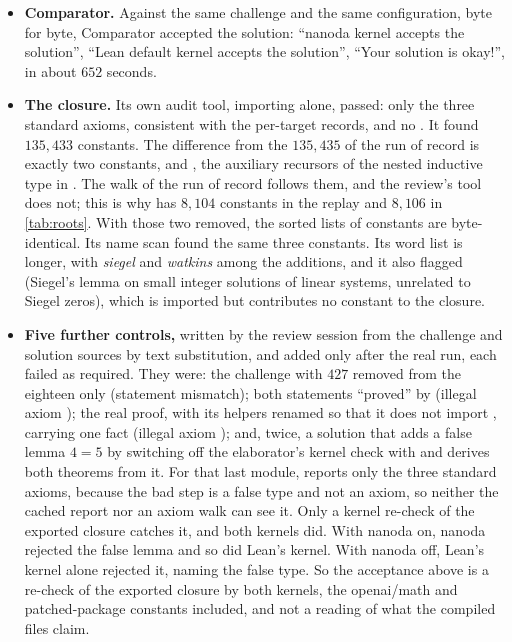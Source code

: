 \documentclass[11pt]{article}
\theoremstyle{definition}
\begin{document}
{\begin{itemize}[nosep]
\item \textbf{Comparator.} Against the same challenge and the same configuration, byte for byte, Comparator accepted the solution: ``nanoda kernel accepts the solution'', ``Lean default kernel accepts the solution'', ``Your solution is okay!'', in about $652$ seconds.
\item \textbf{The closure.} Its own audit tool, importing  alone, passed: only the three standard axioms, consistent with the per-target records, and no . It found $135{,}433$ constants. The difference from the $135{,}435$ of the run of record is exactly two constants,  and , the auxiliary recursors of the nested inductive type  in . The walk of the run of record follows them, and the review's tool does not; this is why  has $8{,}104$ constants in the replay and $8{,}106$ in \cref{tab:roots}. With those two removed, the sorted lists of constants are byte-identical. Its name scan found the same three constants. Its word list is longer, with \emph{siegel} and \emph{watkins} among the additions, and it also flagged  (Siegel's lemma on small integer solutions of linear systems, unrelated to Siegel zeros), which is imported but contributes no constant to the closure.
\item \textbf{Five further controls,} written by the review session from the challenge and solution sources by text substitution, and added only after the real run, each failed as required. They were: the challenge with $427$ removed from the eighteen only (statement mismatch); both statements ``proved'' by  (illegal axiom ); the real proof, with its helpers renamed so that it does not import , carrying one  fact (illegal axiom ); and, twice, a solution that adds a false lemma $4 = 5$ by switching off the elaborator's kernel check with  and derives both theorems from it. For that last module,  reports only the three standard axioms, because the bad step is a false type and not an axiom, so neither the cached report nor an axiom walk can see it. Only a kernel re-check of the exported closure catches it, and both kernels did. With nanoda on, nanoda rejected the false lemma and so did Lean's kernel. With nanoda off, Lean's kernel alone rejected it, naming the false type. So the acceptance above is a re-check of the exported closure by both kernels, the openai/math and patched-package constants included, and not a reading of what the compiled files claim.
\end{itemize}

}
\end{document}
